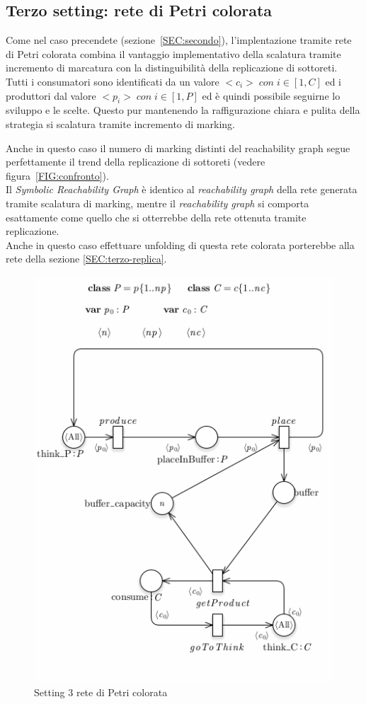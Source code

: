 \documentclass{article}
\begin{document}
\subsection{Terzo setting: rete di Petri colorata}
Come nel caso precendete (sezione~\ref{SEC:secondo}), l'implentazione tramite rete di Petri colorata combina il vantaggio implementativo della scalatura tramite incremento di marcatura con la distinguibilità della replicazione di sottoreti.\\
Tutti i consumatori sono identificati da un valore $<c_i> \; con \; i \in [1,C]$ ed i produttori dal valore $<p_i> \; con \; i \in [1,P]$ ed è quindi possibile seguirne lo sviluppo e le scelte.
Questo pur mantenendo la raffigurazione chiara e pulita della strategia si scalatura tramite incremento di marking.

Anche in questo caso il numero di marking distinti del reachability graph segue perfettamente il trend della replicazione di sottoreti (vedere figura~\ref{FIG:confronto}).\\
Il \textit{Symbolic Reachability Graph} è identico al \textit{reachability graph} della rete generata tramite scalatura di marking, mentre il \textit{reachability graph} si comporta esattamente come quello che si otterrebbe della rete ottenuta tramite replicazione.\\
Anche in questo caso effettuare unfolding di questa rete colorata porterebbe alla rete della sezione \ref{SEC:terzo-replica}.
\begin{figure}[!ht]
\centering
\centerline{\includegraphics[scale=0.5]{./Esercizio2_img/setting_3_CPN.png}}
\caption{Setting 3 rete di Petri colorata} \label{FIG:setting3_CPN}
\end{figure}\\
\end{document}
